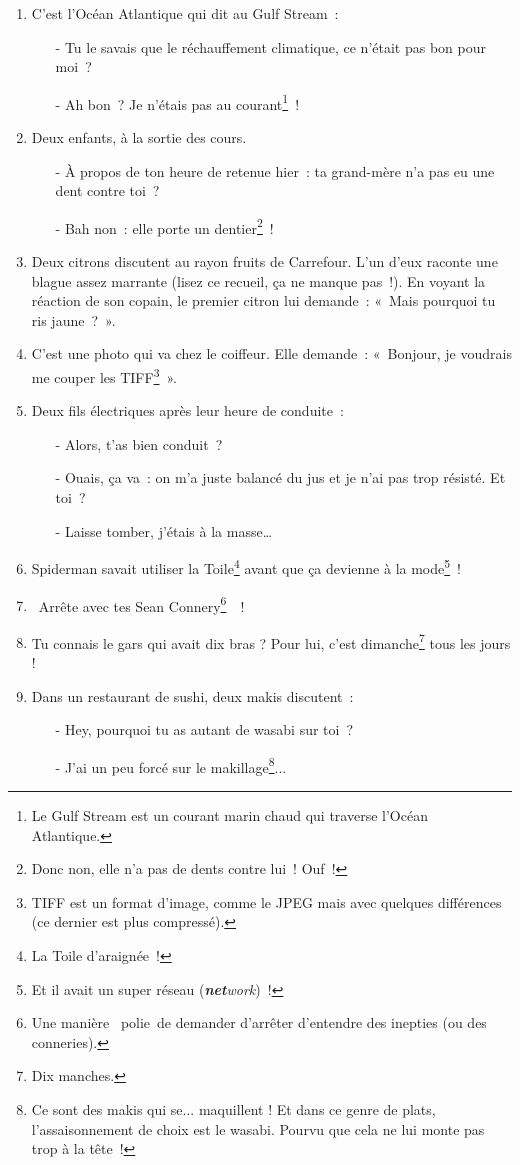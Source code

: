 \documentclass[10pt,a5paper,fullpage]{book}
\begin{document}
\begin{enumerate}
		\item C’est l’Océan Atlantique qui dit au Gulf Stream~:
		\begin{itemize}	
			\item[-] Tu le savais que le réchauffement climatique, ce n’était pas bon pour moi~?
			\item[-] Ah bon~? Je n’étais pas au courant\footnote{Le Gulf Stream est un courant marin chaud qui traverse l’Océan Atlantique.}~!
		\end{itemize}
		\item Deux enfants, à la sortie des cours. 
		\begin{itemize}
			\item[-] À propos de ton heure de retenue hier~: ta grand-mère n’a pas eu une dent contre toi~?
			\item[-] Bah non~: elle porte un dentier\footnote{Donc non, elle n'a pas de dents contre lui~! Ouf~!}~!  
		\end{itemize}
		\item Deux citrons discutent au rayon fruits de Carrefour. L’un d’eux raconte une blague assez marrante (lisez ce recueil, ça ne manque pas~!). En voyant la réaction de son copain, le premier citron lui demande~: «~Mais pourquoi tu ris jaune~?~».
		\item C’est une photo qui va chez le coiffeur. Elle demande~: «~Bonjour, je voudrais me couper les TIFF\footnote{TIFF est un format d’image, comme le JPEG mais avec quelques différences (ce dernier est plus compressé).}~».
		\item Deux fils électriques après leur heure de conduite~: 
		\begin{itemize}
			\item[-] Alors, t’as bien conduit~?
			\item[-] Ouais, ça va~: on m’a juste balancé du jus et je n’ai pas trop résisté. Et toi~?
			\item[-] Laisse tomber, j’étais à la masse… 
		\end{itemize}
		\item Spiderman savait utiliser la Toile\footnote{La Toile d’araignée~!} avant que ça devienne à la mode\footnote{Et il avait un super réseau (\textit{\textbf{net}work})~!}~!
		\item \guillemotleft~Arrête avec tes Sean Connery\footnote{Une manière \guillemotleft~polie~\guillemotright de demander d'arrêter d'entendre des inepties (ou des conneries).}~\guillemotright~!
		\item Tu connais le gars qui avait dix bras ? Pour lui, c'est dimanche\footnote{Dix manches.} tous les jours !
		\item Dans un restaurant de sushi, deux makis discutent~:
		\begin{itemize}
			\item[-] Hey, pourquoi tu as autant de wasabi sur toi~?
			\item[-] J'ai un peu forcé sur le makillage\footnote{Ce sont des makis qui se... maquillent ! Et dans ce genre de plats, l'assaisonnement de choix est le wasabi. Pourvu que cela ne lui monte pas trop à la tête~!}...
		\end{itemize}
	\end{enumerate}
	
\end{document}
